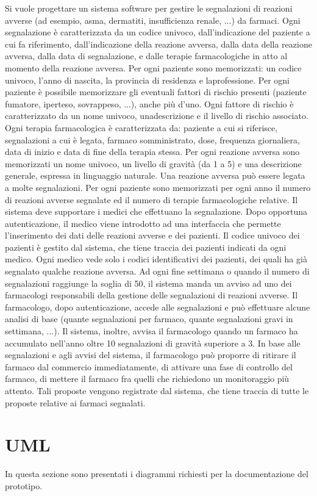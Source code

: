 \documentclass[a4paper]{article}
\begin{document}
		\begin{changemargin}{1cm}{0.5cm}
			Si vuole progettare un sistema software per gestire le segnalazioni di reazioni avverse (ad esempio, asma, dermatiti, insufficienza renale, ...) da farmaci. Ogni segnalazione è caratterizzata da un codice univoco, dall’indicazione del paziente a cui fa riferimento, dall’indicazione della reazione avversa, dalla data della reazione avversa, dalla data di segnalazione, e dalle terapie farmacologiche in atto al momento della reazione avversa. Per ogni paziente sono memorizzati: un codice univoco, l’anno di nascita, la provincia di residenza e laprofessione. Per ogni paziente è possibile memorizzare gli eventuali fattori di rischio presenti (paziente fumatore, iperteso, sovrappeso, ...), anche più d’uno. Ogni fattore di rischio è caratterizzato da un nome univoco, unadescrizione e il livello di rischio associato. Ogni terapia farmacologica è caratterizzata da: paziente a cui si riferisce, segnalazioni a cui è legata, farmaco somministrato, dose, frequenza giornaliera, data di inizio e data di fine della terapia stessa. Per ogni reazione avversa sono memorizzati un nome univoco, un livello di gravità (da 1 a 5) e una descrizione generale, espressa in linguaggio naturale. Una reazione avversa può essere legata a molte segnalazioni. Per ogni paziente sono memorizzati per ogni anno il numero di reazioni avverse segnalate ed il numero di terapie farmacologiche relative. Il sistema deve supportare i medici che effettuano la segnalazione. Dopo opportuna autenticazione, il medico viene introdotto ad una interfaccia che permette l’inserimento dei dati delle reazioni avverse e dei pazienti. Il codice univoco dei pazienti è gestito dal sistema, che tiene traccia dei pazienti indicati da ogni medico. Ogni medico vede solo i codici identificativi dei pazienti, dei quali ha già segnalato qualche reazione avversa. Ad ogni fine settimana o quando il numero di segnalazioni raggiunge la soglia di 50, il sistema manda un avviso ad uno dei farmacologi responsabili della gestione delle segnalazioni di reazioni avverse. Il farmacologo, dopo autenticazione, accede alle segnalazioni e può effettuare alcune analisi di base (quante segnalazioni per farmaco, quante segnalazioni gravi in settimana, ...). Il sistema, inoltre, avvisa il farmacologo quando un farmaco ha accumulato nell’anno oltre 10 segnalazioni di gravità superiore a 3. In base alle segnalazioni e agli avvisi del sistema, il farmacologo può proporre di ritirare il farmaco dal commercio immediatamente, di attivare una fase di controllo del farmaco, di mettere il farmaco fra quelli che richiedono un monitoraggio più attento. Tali proposte vengono registrate dal sistema, che tiene traccia di tutte le proposte relative ai farmaci segnalati.
		\end{changemargin}
	
	\section{UML}
		In questa sezione sono presentati i diagrammi richiesti per la documentazione del prototipo.
		
		
\end{document}
